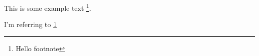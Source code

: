 \documentclass{article}
\begin{document}
	This is some example text \footnote{\label{myfootnote}Hello footnote}.
	
	I'm referring to \ref{myfootnote}
\end{document}
